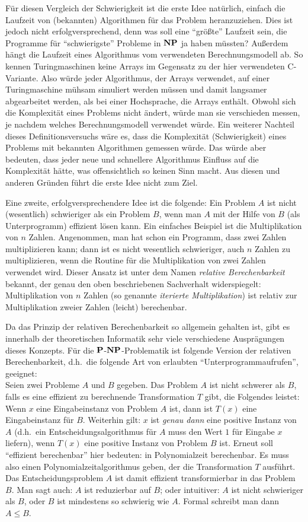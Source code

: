 Für diesen Vergleich der Schwierigkeit ist die erste Idee natürlich,
einfach die Laufzeit von (bekannten) Algorithmen für das Problem
heranzuziehen. Dies ist jedoch nicht erfolgversprechend, denn was soll
eine "`größte"' Laufzeit sein, die Programme für "`schwierigste"'
Probleme in $\NP$ ja haben müssten?  Außerdem hängt die Laufzeit eines
Algorithmus vom verwendeten Berechnungsmodell ab. So kennen
Turingmaschinen keine Arrays im Gegensatz zu der hier verwendeten
C-Variante. Also würde jeder Algorithmus, der Arrays verwendet,
auf einer Turingmaschine mühsam simuliert werden müssen und damit
langsamer abgearbeitet werden, als bei einer Hochsprache, die Arrays
enthält. Obwohl sich die Komplexität eines Problems nicht ändert,
würde man sie verschieden messen, je nachdem welches Berechnungsmodell
verwendet würde. Ein weiterer Nachteil dieses Definitionsversuchs wäre
es, dass die Komplexität (Schwierigkeit) eines Problems mit bekannten
Algorithmen gemessen würde. Das würde aber bedeuten, dass jeder neue
und schnellere Algorithmus Einfluss auf die Komplexität hätte, was
offensichtlich so keinen Sinn macht.  Aus diesen und anderen Gründen
führt die erste Idee nicht zum Ziel.

Eine zweite, erfolgversprechendere Idee ist die folgende: Ein Problem
$A$ ist nicht (wesentlich) schwieriger als ein Problem $B$, wenn man
$A$ mit der Hilfe von $B$ (als Unterprogramm) effizient lösen
kann. Ein einfaches Beispiel ist die Multiplikation von $n$ Zahlen.
Angenommen, man hat schon ein Programm, dass zwei Zahlen multiplizieren
kann; dann ist es nicht wesentlich schwieriger, auch $n$ Zahlen zu
multiplizieren, wenn die Routine für die Multiplikation von zwei Zahlen
verwendet wird. Dieser Ansatz ist unter dem Namen \emph{relative
  Berechenbarkeit} bekannt, der genau den oben beschriebenen
Sachverhalt widerspiegelt: Multiplikation von $n$ Zahlen (so genannte
\emph{iterierte Multiplikation}) ist relativ zur Multiplikation zweier
Zahlen (leicht) berechenbar.

Da das Prinzip der relativen Berechenbarkeit so allgemein gehalten
ist, gibt es innerhalb der theoretischen Informatik sehr viele
verschiedene Ausprägungen dieses Konzepts. Für die
$\P$-$\NP$-Problematik ist folgende Version der relativen
Berechenbarkeit, d.h.~die folgende Art von erlaubten
"`Unterprogrammaufrufen"', geeignet:\\
%
Seien zwei Probleme $A$ und $B$ gegeben. Das Problem $A$ ist nicht
schwerer als $B$, falls es eine effizient zu berechnende
Transformation $T$ gibt, die Folgendes leistet: Wenn $x$ eine
Eingabeinstanz von Problem $A$ ist, dann ist $T(x)$ eine
Eingabeinstanz für $B$. Weiterhin gilt: $x$ ist \emph{genau dann} eine
positive Instanz von $A$ (d.h.~ein Entscheidungsalgorithmus für $A$
muss den Wert $1$ für Eingabe $x$ liefern), wenn $T(x)$ eine positive
Instanz von Problem $B$ ist. Erneut soll "`effizient berechenbar"'
hier bedeuten: in Polynomialzeit berechenbar. Es muss also einen
Polynomialzeitalgorithmus geben, der die Transformation $T$ ausführt.
Das Entscheidungsproblem $A$ ist damit effizient transformierbar in
das Problem $B$. Man sagt auch: $A$ ist reduzierbar auf $B$; oder
intuitiver: $A$ ist nicht schwieriger als $B$, oder $B$ ist mindestens
so schwierig wie $A$. Formal schreibt man dann $A\leq B$.


